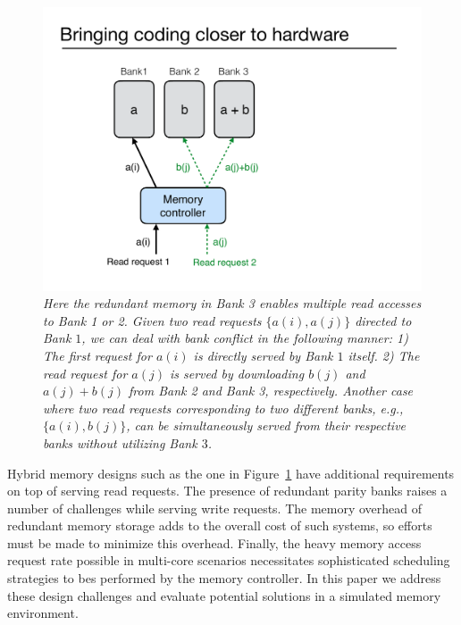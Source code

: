 \begin{figure}[t!]
\centering
\includegraphics[width=0.395\linewidth]{fig/example-xor.pdf}
\caption{\it{Here the redundant memory in Bank 3 enables multiple read accesses to Bank 1 or 2. Given two read requests $\{a(i), a(j)\}$ directed to Bank $1$, we can deal with bank conflict in the following manner: 1) The first request for $a(i)$ is directly served by Bank $1$ itself.  2) The read request for $a(j)$ is served by downloading $b(j)$ and $a(j) + b(j)$ from Bank 2 and Bank 3, respectively. Another case where two read requests corresponding to two different banks, e.g., $\{a(i), b(j)\}$, can be simultaneously served from their respective banks without utilizing Bank $3$.}}
\label{fig:example_xor}
\end{figure}
Hybrid memory designs such as the one in Figure~\ref{fig:example_xor} have additional requirements on top of serving read requests. The presence of redundant parity banks raises a number of challenges while serving write requests. The memory overhead of redundant memory storage adds to the overall cost of such systems, so efforts must be made to minimize this overhead. Finally, the heavy memory access request rate possible in multi-core scenarios necessitates sophisticated scheduling strategies to bes performed by the memory controller. In this paper we address these design challenges and evaluate potential solutions in a simulated memory environment. 

